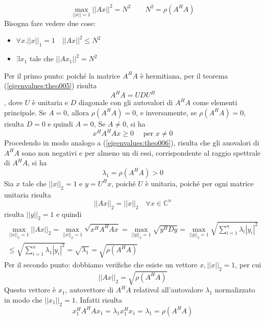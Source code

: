 \begin{thproof}
$$ \max_{||x|| =1} || Ax||^{2} = N^{2} \qquad N^{2} = \rho(A^{H}A)$$
Bisogna fare vedere due cose:
\begin{itemize}
 \item $ \forall x. ||x||_{1} = 1 \quad  || Ax||^{2} \leq N^{2} $
 \item  $\exists x_1$ tale che $ ||Ax_{1} ||^{2} = N^{2} $
\end{itemize}
Per il primo punto: poich\'e la matrice $A^{H}A$ \`e hermitiana,
per il teorema (\ref{eigenvalues:theo005}) risulta
$$ A^{H}A = UDU^{H}$$,
dove $U$ \`e unitaria e $D$ diagonale con gli autovalori di $A^{H}A$ come
elementi principale. Se $A = 0$, allora $\rho(A^{H}A)=0$, e inversamente, se
$\rho(A^{H}A)=0$, risulta $D=0$ e quindi $A=0$, Se $A \neq 0$, si ha
$$ x^{H}A^{H}Ax \geq 0 \quad \text{ per } x \neq 0$$
Procedendo in modo analogo a (\ref{eigenvalues:theo006}), risulta che
gli auovalori di $A^{H}A$ sono non negativi e per almeno un di essi,
corrispondente al raggio spettrale di $A^{H}A$, si ha
$$\lambda_1 = \rho(A^{H}A)> 0$$
Sia $x$ tale che $||x||_{2}=1$ e $y=U^{H}x$, poich\'e $U$ \`e unitaria, 
poich\'e per ogni matrice unitaria risulta
$$ ||Ax||_{2} = ||x||_2 \quad \forall x \in \mathbb{C}^{n}$$
risulta $||y||_{2} = 1$ e quindi
$$ 
\begin{array}{c}
\displaystyle \max_{||x||_{2}=1} ||Ax||_{2} = 
 \displaystyle \max_{||x||_{2}=1} \sqrt{x^{H}A^{H}Ax} = 
 \displaystyle \max_{||y||_{2}=1} \sqrt{y^{H}Dy} = 
 \displaystyle \max_{||y||_{2}=1} \sqrt{
 \displaystyle \sum_{i=1}^{n} \lambda_i |y_i|^{2}} \\
\leq
 \displaystyle \sqrt{\sum_{i=1}^{n} \lambda_1 |y_i|^{2}}
 = 
\sqrt{\lambda_1} = \sqrt{\rho(A^{H}A)} 
\end{array}
$$
Per il secondo punto: dobbiamo verifiche che esiste un vettore
$x, ||x||_{2} = 1$, per cui
$$ ||Ax||_{2} = \sqrt{\rho(A^{H}A)}$$
Questo vettore \`e $x_1$, autovettore di $A^{H}A$ relativol all'autovalore
$\lambda_1$ normalizzato in modo che $||x_1||_{2}=1$. Infatti
risulta 
$$x_1^{H}A^{H}Ax_1 = \lambda_1 x_1^{H}x_1 = \lambda_1 = \rho(A^{H}A)$$
\end{thproof}

\outbpdocument

